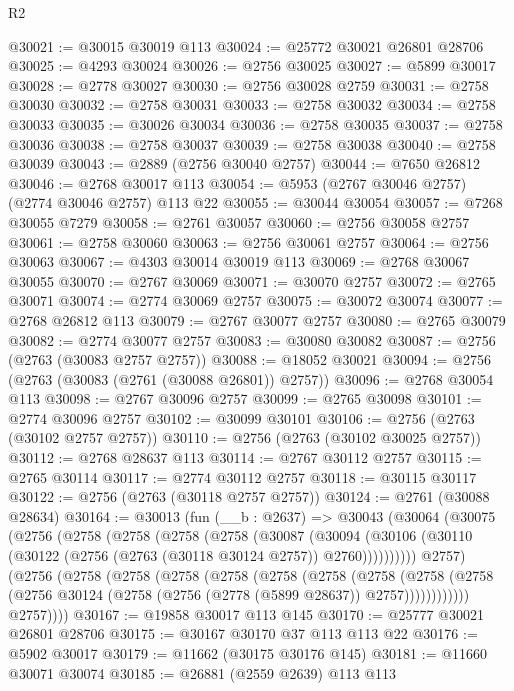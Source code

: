 \begin{lexlean}{R2}
\begin{coremodule}
@30021 := @30015 @30019 @113
@30024 := @25772 @30021 @26801 @28706
@30025 := @4293 @30024
@30026 := @2756 @30025
@30027 := @5899 @30017
@30028 := @2778 @30027
@30030 := @2756 @30028 @2759
@30031 := @2758 @30030
@30032 := @2758 @30031
@30033 := @2758 @30032
@30034 := @2758 @30033
@30035 := @30026 @30034
@30036 := @2758 @30035
@30037 := @2758 @30036
@30038 := @2758 @30037
@30039 := @2758 @30038
@30040 := @2758 @30039
@30043 := @2889 (@2756 @30040 @2757)
@30044 := @7650 @26812
@30046 := @2768 @30017 @113
@30054 := @5953 (@2767 @30046 @2757) (@2774 @30046 @2757) @113 @22
@30055 := @30044 @30054
@30057 := @7268 @30055 @7279
@30058 := @2761 @30057
@30060 := @2756 @30058 @2757
@30061 := @2758 @30060
@30063 := @2756 @30061 @2757
@30064 := @2756 @30063
@30067 := @4303 @30014 @30019 @113
@30069 := @2768 @30067 @30055
@30070 := @2767 @30069
@30071 := @30070 @2757
@30072 := @2765 @30071
@30074 := @2774 @30069 @2757
@30075 := @30072 @30074
@30077 := @2768 @26812 @113
@30079 := @2767 @30077 @2757
@30080 := @2765 @30079
@30082 := @2774 @30077 @2757
@30083 := @30080 @30082
@30087 := @2756 (@2763 (@30083 @2757 @2757))
@30088 := @18052 @30021
@30094 := @2756 (@2763 (@30083 (@2761 (@30088 @26801)) @2757))
@30096 := @2768 @30054 @113
@30098 := @2767 @30096 @2757
@30099 := @2765 @30098
@30101 := @2774 @30096 @2757
@30102 := @30099 @30101
@30106 := @2756 (@2763 (@30102 @2757 @2757))
@30110 := @2756 (@2763 (@30102 @30025 @2757))
@30112 := @2768 @28637 @113
@30114 := @2767 @30112 @2757
@30115 := @2765 @30114
@30117 := @2774 @30112 @2757
@30118 := @30115 @30117
@30122 := @2756 (@2763 (@30118 @2757 @2757))
@30124 := @2761 (@30088 @28634)
@30164 := @30013
    (fun (__b : @2637) =>
    @30043
      (@30064
        (@30075
          (@2756
            (@2758
              (@2758
                (@2758
                  (@2758
                    (@30087
                      (@30094
                        (@30106 (@30110 (@30122 (@2756 (@2763 (@30118 @30124 @2757)) @2760))))))))))
            @2757)
          (@2756
            (@2758
              (@2758
                (@2758
                  (@2758
                    (@2758
                      (@2758
                        (@2758
                          (@2758
                            (@2758
                              (@2756 @30124 (@2758 (@2756 (@2778 (@5899 @28637)) @2757))))))))))))
            @2757))))
@30167 := @19858 @30017 @113 @145
@30170 := @25777 @30021 @26801 @28706
@30175 := @30167 @30170 @37 @113 @113 @22
@30176 := @5902 @30017
@30179 := @11662 (@30175 @30176 @145)
@30181 := @11660 @30071 @30074
@30185 := @26881 (@2559 @2639) @113 @113

\end{coremodule}
\end{lexlean}
